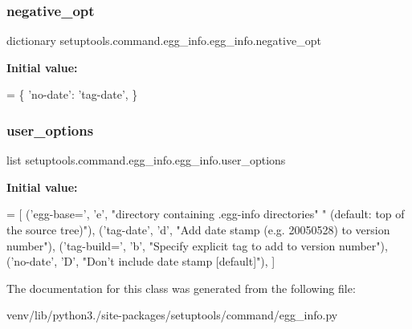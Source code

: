 \subsubsection{\texorpdfstring{negative\+\_\+opt}{negative\_opt}}
{\footnotesize\ttfamily dictionary setuptools.\+command.\+egg\+\_\+info.\+egg\+\_\+info.\+negative\+\_\+opt\hspace{0.3cm}{\ttfamily [static]}}

{\bfseries Initial value\+:}
\begin{DoxyCode}
=  \{
        \textcolor{stringliteral}{'no-date'}: \textcolor{stringliteral}{'tag-date'},
    \}
\end{DoxyCode}
\mbox{\label{classsetuptools_1_1command_1_1egg__info_1_1egg__info_a77231052ffcc31b95fd27ea6747df6d6}} 
\subsubsection{\texorpdfstring{user\+\_\+options}{user\_options}}
{\footnotesize\ttfamily list setuptools.\+command.\+egg\+\_\+info.\+egg\+\_\+info.\+user\+\_\+options\hspace{0.3cm}{\ttfamily [static]}}

{\bfseries Initial value\+:}
\begin{DoxyCode}
=  [
        (\textcolor{stringliteral}{'egg-base='}, \textcolor{stringliteral}{'e'}, \textcolor{stringliteral}{"directory containing .egg-info directories"}
                           \textcolor{stringliteral}{" (default: top of the source tree)"}),
        (\textcolor{stringliteral}{'tag-date'}, \textcolor{stringliteral}{'d'}, \textcolor{stringliteral}{"Add date stamp (e.g. 20050528) to version number"}),
        (\textcolor{stringliteral}{'tag-build='}, \textcolor{stringliteral}{'b'}, \textcolor{stringliteral}{"Specify explicit tag to add to version number"}),
        (\textcolor{stringliteral}{'no-date'}, \textcolor{stringliteral}{'D'}, \textcolor{stringliteral}{"Don't include date stamp [default]"}),
    ]
\end{DoxyCode}


The documentation for this class was generated from the following file\+:\begin{DoxyCompactItemize}
\item 
venv/lib/python3./site-\/packages/setuptools/command/egg\+\_\+info.\+py\end{DoxyCompactItemize}
